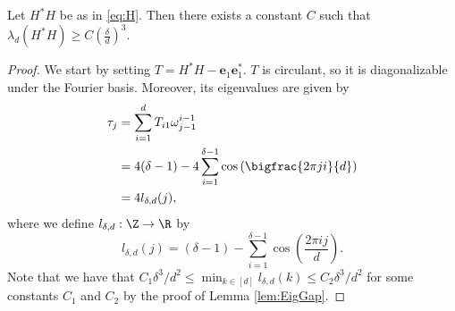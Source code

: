 \begin{lem}\label{lem:SpectrumHelper}Let $H^*H$ be as in \eqref{eq:H}. Then there exists a constant $C$ such that $\lambda_d(H^*H)\geq C\left(\frac{\delta}{d}\right)^3.$
\end{lem}
\begin{proof}
We start by setting $T = H^* H - \mathbf{e}_1 \mathbf{e}_1^*$.  $T$ is circulant, so it is diagonalizable under the Fourier basis. Moreover, its eigenvalues are given by %
\begin{align}
\tau_j & =  \sum_{i = 1}^d T_{i1} \omega_{j-1}^{i-1} \nonumber\\
& =  4(\delta - 1) - 4 \sum_{i=1}^{\delta - 1} \cos\left(\bigfrac{2 \pi ji}{d}\right) \nonumber\\
& =  4 l_{\delta, d}(j),
\end{align}
where %
we define $l_{\delta, d} : \Z \to \R$ by 
\[l_{\delta, d}(j) = (\delta - 1) - \sum_{i=1}^{\delta - 1} \cos\left(\frac{2 \pi i j}{d} \right).\] Note that we have that $C_1 \delta^3 / d^2 \leq \min_{k \in [d]} l_{\delta, d}(k) \leq C_2 \delta^3 / d^2$ for some constants $C_1$ and $C_2$ by the proof of Lemma \ref{lem:EigGap}. %


\end{proof}
